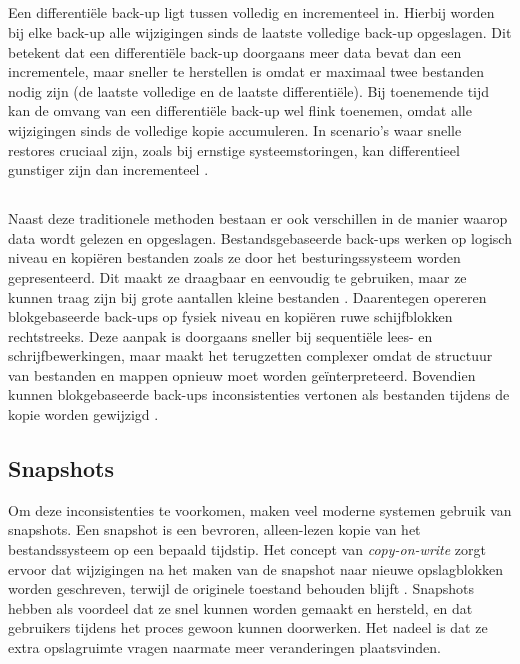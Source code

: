 \subsection{}%
\label{subsec:differentielebackup}

Een differentiële back-up ligt tussen volledig en incrementeel in. Hierbij worden bij elke back-up alle wijzigingen sinds de laatste volledige back-up opgeslagen. Dit betekent dat een differentiële back-up doorgaans meer data bevat dan een incrementele, maar sneller te herstellen is omdat er maximaal twee bestanden nodig zijn (de laatste volledige en de laatste differentiële). Bij toenemende tijd kan de omvang van een differentiële back-up wel flink toenemen, omdat alle wijzigingen sinds de volledige kopie accumuleren. In scenario’s waar snelle restores cruciaal zijn, zoals bij ernstige systeemstoringen, kan differentieel gunstiger zijn dan incrementeel \autocite{Sullivan2025}.

\subsection{}%
\label{subsec:bestandvsblok}

Naast deze traditionele methoden bestaan er ook verschillen in de manier waarop data wordt gelezen en opgeslagen. Bestandsgebaseerde back-ups werken op logisch niveau en kopiëren bestanden zoals ze door het besturingssysteem worden gepresenteerd. Dit maakt ze draagbaar en eenvoudig te gebruiken, maar ze kunnen traag zijn bij grote aantallen kleine bestanden \autocite{Tanenbaum2015}. Daarentegen opereren blokgebaseerde back-ups op fysiek niveau en kopiëren ruwe schijfblokken rechtstreeks. Deze aanpak is doorgaans sneller bij sequentiële lees- en schrijfbewerkingen, maar maakt het terugzetten complexer omdat de structuur van bestanden en mappen opnieuw moet worden geïnterpreteerd. Bovendien kunnen blokgebaseerde back-ups inconsistenties vertonen als bestanden tijdens de kopie worden gewijzigd \autocite{Zheng2018}.

\subsection{Snapshots}%
\label{subsec:snapshots}

Om deze inconsistenties te voorkomen, maken veel moderne systemen gebruik van snapshots. Een snapshot is een bevroren, alleen-lezen kopie van het bestandssysteem op een bepaald tijdstip. Het concept van \textit{copy-on-write} zorgt ervoor dat wijzigingen na het maken van de snapshot naar nieuwe opslagblokken worden geschreven, terwijl de originele toestand behouden blijft \autocite{Nakamura2020}. Snapshots hebben als voordeel dat ze snel kunnen worden gemaakt en hersteld, en dat gebruikers tijdens het proces gewoon kunnen doorwerken. Het nadeel is dat ze extra opslagruimte vragen naarmate meer veranderingen plaatsvinden.


